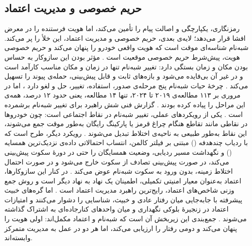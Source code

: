 \documentclass[12pt,a4paper]{article}
\begin{document}
\subsection{حریم خصوصی و مدیریت اعتماد}

رمزنگاری، یکپارچگی و اصالت پیام را تأمین می‌کند، اما هویت فرستنده را در معرض افشا قرار می‌دهد؛ لایه‌ی بعدی، حریم خصوصی و مدیریت اعتماد، این خلأ را پر می‌کند. شبه‌نام شناسه‌ای موقت است که هویت واقعی خودرو را پنهان می‌کند \cite{rahmawatiagustinaSystematicLiteratureReview2025} و حریم خصوصی هویت، پیش‌شرط حریم خصوصی موقعیت است \cite{luPseudonymChangingSocial2012}. مؤثر بودن این سازوکار به حساس بودن مکان و زمان بستگی دارد: تغییر شبه‌نام تنها در زمان و مکان مناسب کارآمد است و در غیر آن بی‌فایده می‌شود \cite{luPseudonymChangingSocial2012} و بازه‌های ثابت و قابل پیش‌بینی، حمله‌ی پیوند را تسهیل می‌کند \cite{rahmawatiagustinaSystematicLiteratureReview2025}. چرخهٔ حیات شبه‌نام پنج مرحله‌ی صدور، استفاده، تغییر، حل و لغو دارد \cite{rahmawatiagustinaSystematicLiteratureReview2025}، اما در مروری بر ۱۱۳ مطالعه‌ی ۲۰۱۹ تا ۲۰۲۴، تنها ۱۴ مطالعه، یعنی حدود ۱۲ درصد، همه‌ی این مراحل را پیاده کرده بودند \cite{rahmawatiagustinaSystematicLiteratureReview2025}. گزارش فنی  شش راهبرد برای تغییر شبه‌نام برشمرده است \cite{rahmawatiagustinaSystematicLiteratureReview2025}. یکی از رویکرد‌های عملی، تغییر شبه‌نام در نقاط اجتماعی است: چون خودرو‌ها در نقاطی مانند تقاطع هنگام چراغ قرمز یا پارکینگ رایگان به‌طور موقت جمع می‌شوند، این نقاط به‌طور طبیعی به ناحیه‌ی اختلاط تبدیل می‌شوند \cite{luPseudonymChangingSocial2012}. رویکرد دیگر، طرح  است که با ردیاب چندهدفه () مبتنی بر فیلتر کالمن، انتساب احتمالاتی داده‌ی نزدیک‌ترین همسایه () و نگهداشت مسیر ردیابی، وضعیت همسایگان را حتی در دورهٔ سکوت پیش‌بینی می‌کند، در صورت پیش‌بینی تصادف از سکوت خارج می‌شود و در صورت احتمال اختلاط زمینه، بدون ورود به سکوت شبه‌نام عوض می‌کند \cite{al-aniPrivacySafetyImprovement2023}. در کنار این سازوکار‌ها، اعتماد به‌عنوان معیار امنیتی تکمیلی، اطمینان یک نهاد به نهاد دیگر است \cite{farsimadanReviewSecurityChallenges2025} و روش جمع وزنی شاخص‌های اعتماد، رایج‌ترین راهبرد مدیریت اعتماد است \cite{farsimadanReviewSecurityChallenges2025}. اما گره‌های خبیث پیشرفته با جابه‌جایی میان رفتار عادی و خبیث، شناسایی را دشوار می‌کنند \cite{farsimadanReviewSecurityChallenges2025} و امتیازات اعتماد در زنجیرهٔ بلوکی نگهداری و میان واحد‌های کنارجاده‌ای به اشتراک گذاشته می‌شوند \cite{razaBlockchainBasedReputationTrust2024}. جمع‌بندی این زیربخش آن است که شبه‌نام و اعتماد مکمل‌اند: اولی هویت را پنهان می‌کند و دومی رفتار را ارزیابی می‌کند، اما هر دو در عمل به مدیریت متمرکز وابسته‌اند.
\end{document}
